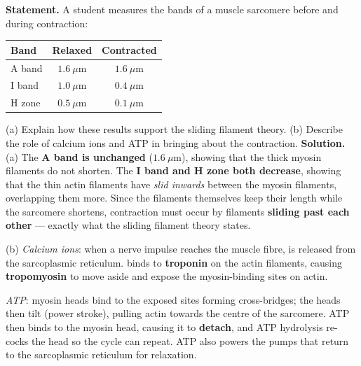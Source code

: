 \documentclass[11pt]{article}
\begin{document}
\begin{exoresolu}
\textbf{Statement.} A student measures the bands of a muscle sarcomere before and during contraction:

\begin{center}
\begin{tabular}{|l|c|c|}
\hline
\rowcolor{popblueL} \textbf{Band} & \textbf{Relaxed} & \textbf{Contracted} \\
\hline
A band & $1.6\ \mu\mathrm{m}$ & $1.6\ \mu\mathrm{m}$ \\
I band & $1.0\ \mu\mathrm{m}$ & $0.4\ \mu\mathrm{m}$ \\
H zone & $0.5\ \mu\mathrm{m}$ & $0.1\ \mu\mathrm{m}$ \\
\hline
\end{tabular}
\end{center}

(a) Explain how these results support the sliding filament theory. (b) Describe the role of calcium ions and ATP in bringing about the contraction.
\tcblower
\textbf{Solution.}
(a) The \textbf{A band is unchanged} ($1.6\ \mu\mathrm{m}$), showing that the thick myosin filaments do not shorten. The \textbf{I band and H zone both decrease}, showing that the thin actin filaments have \emph{slid inwards} between the myosin filaments, overlapping them more. Since the filaments themselves keep their length while the sarcomere shortens, contraction must occur by filaments \textbf{sliding past each other} --- exactly what the sliding filament theory states.

(b) \emph{Calcium ions}: when a nerve impulse reaches the muscle fibre,  is released from the sarcoplasmic reticulum.  binds to \textbf{troponin} on the actin filaments, causing \textbf{tropomyosin} to move aside and expose the myosin-binding sites on actin.

\emph{ATP}: myosin heads bind to the exposed sites forming cross-bridges; the heads then tilt (power stroke), pulling actin towards the centre of the sarcomere. ATP then binds to the myosin head, causing it to \textbf{detach}, and ATP hydrolysis re-cocks the head so the cycle can repeat. ATP also powers the pumps that return  to the sarcoplasmic reticulum for relaxation.
\end{exoresolu}
\end{document}
